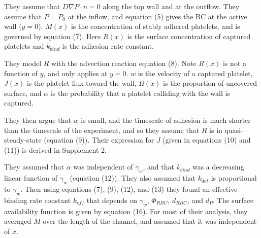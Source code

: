 \documentclass[
10pt, %
letterpaper, %
twocolumn, %
landscape %
]{article}
\begin{document}
They assume that $D\nabla P \cdot n = 0$ along the top wall and at the
outflow. They assume that $P = P_0$ at the inflow, and equation (5)
gives the BC at the active wall ($y=0$). $M(x)$ is the concentration
of stably adhered platelets, and is governed by equation (7). Here
$R(x)$ is the surface concentration of captured platelets and
$k_\textit{bind}$ is the adhesion rate constant. 

They model $R$ with the advection reaction equation (8).
Note $R(x)$ is not a function of $y$, and only applies at $y=0$. $w$
is the velocity of a captured platelet, $J(x)$ is the platelet flux
toward the wall, $\Omega(x)$ is the proportion of uncovered surface,
and $\alpha$ is the probability that a platelet colliding with the
wall is captured. 

They then argue that $w$ is small, and the timescale of adhesion is
much shorter than the timescale of the experiment, and so they assume
that $R$ is in quasi-steady-state (equation (9)).
Their expression for $J$ (given in equations (10) and (11)) is derived
in Supplement 2.

They assumed that $\alpha$ was independent of $\dot{\gamma}_w$, and
that $k_\textit{bind}$ was a decreasing linear function of
$\dot{\gamma}_w$ (equation (12)). They also assumed that
$k_\textit{det}$ is proportional to $\dot{\gamma}_w$. Then using
equations (7), (9), (12), and (13) they found an effective binding
rate constant $k_\textit{eff}$ that depends on $\dot{\gamma}_w$, $\Phi_\textit{RBC}$,
$d_\textit{RBC}$, and $d_P$. The surface availability function is
given by equation (16). For most of their analysis, they averaged $M$
over the length of the channel, and assumed that it was independent of
$x$. 
\end{document}
